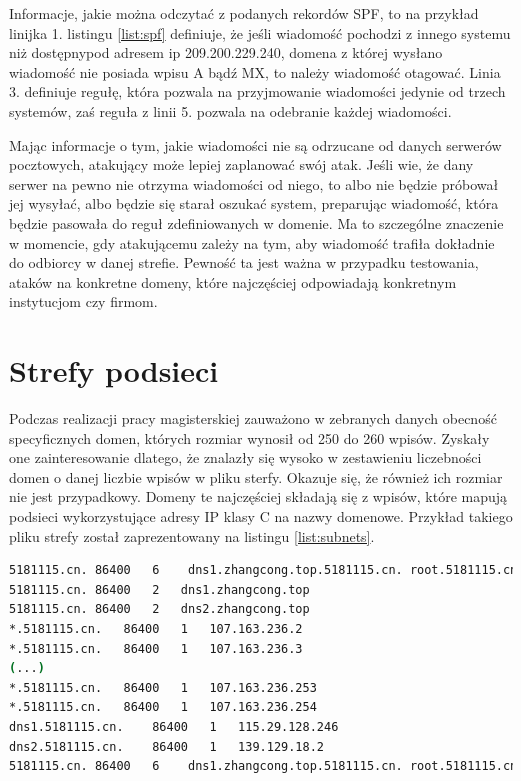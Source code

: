 Informacje, jakie można odczytać z podanych rekordów SPF, to na przykład linijka 1. listingu \ref{list:spf} definiuje, że jeśli
wiadomość pochodzi z innego systemu niż dostępnypod adresem ip 209.200.229.240, domena z której wysłano wiadomość nie posiada
wpisu A bądź MX, to należy wiadomość otagować. Linia 3. definiuje regułę, która pozwala na przyjmowanie wiadomości jedynie od trzech
systemów, zaś reguła z linii 5. pozwala na odebranie każdej wiadomości.

Mając informacje o tym, jakie wiadomości nie są odrzucane od danych serwerów pocztowych, atakujący może lepiej zaplanować swój atak.
Jeśli wie, że dany serwer na pewno nie otrzyma wiadomości od niego, to albo nie będzie próbował jej wysyłać, albo będzie się starał
oszukać system, preparując wiadomość, która będzie pasowała do reguł zdefiniowanych w domenie. Ma to szczególne znaczenie w momencie,
gdy atakującemu zależy na tym, aby wiadomość trafiła dokładnie do odbiorcy w danej strefie. Pewność ta jest ważna w przypadku
testowania, ataków na konkretne domeny, które najczęściej odpowiadają konkretnym instytucjom czy firmom.

\section{Strefy podsieci}
\noindent Podczas realizacji pracy magisterskiej zauważono w zebranych danych obecność specyficznych domen, których rozmiar wynosił od
250 do 260 wpisów. Zyskały one zainteresowanie dlatego, że znalazły się wysoko w zestawieniu liczebności domen o danej liczbie wpisów
w pliku sterfy. Okazuje się, że również ich rozmiar nie jest przypadkowy. Domeny te najczęściej składają się z wpisów, które mapują
podsieci wykorzystujące adresy IP klasy C na nazwy domenowe. Przykład takiego pliku strefy został zaprezentowany na
listingu \ref{list:subnets}.

\begin{lstlisting}[label={list:subnets},captionpos=b,caption=Przykład domeny mapującej podsieć.,language=bash]
5181115.cn.	86400	6	 dns1.zhangcong.top.5181115.cn. root.5181115.cn. 1852269423 1852244852 1869660172 74608495 1958743040
5181115.cn.	86400	2	dns1.zhangcong.top
5181115.cn.	86400	2	dns2.zhangcong.top
*.5181115.cn.	86400	1	107.163.236.2
*.5181115.cn.	86400	1	107.163.236.3
(...)
*.5181115.cn.	86400	1	107.163.236.253
*.5181115.cn.	86400	1	107.163.236.254
dns1.5181115.cn.	86400	1	115.29.128.246
dns2.5181115.cn.	86400	1	139.129.18.2
5181115.cn.	86400	6	 dns1.zhangcong.top.5181115.cn. root.5181115.cn. 1 86400 3600 604800 10800
\end{lstlisting}

